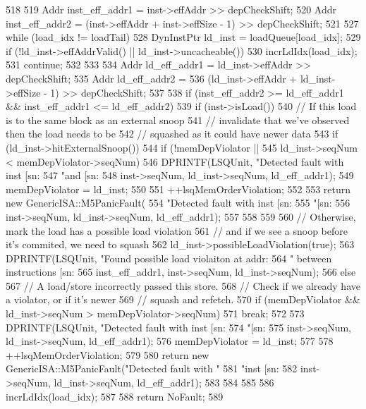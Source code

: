 \begin{DoxyCode}
518 {
519     Addr inst_eff_addr1 = inst->effAddr >> depCheckShift;
520     Addr inst_eff_addr2 = (inst->effAddr + inst->effSize - 1) >> depCheckShift;
521 
527     while (load_idx != loadTail) {
528         DynInstPtr ld_inst = loadQueue[load_idx];
529         if (!ld_inst->effAddrValid() || ld_inst->uncacheable()) {
530             incrLdIdx(load_idx);
531             continue;
532         }
533 
534         Addr ld_eff_addr1 = ld_inst->effAddr >> depCheckShift;
535         Addr ld_eff_addr2 =
536             (ld_inst->effAddr + ld_inst->effSize - 1) >> depCheckShift;
537 
538         if (inst_eff_addr2 >= ld_eff_addr1 && inst_eff_addr1 <= ld_eff_addr2) {
539             if (inst->isLoad()) {
540                 // If this load is to the same block as an external snoop
541                 // invalidate that we've observed then the load needs to be
542                 // squashed as it could have newer data
543                 if (ld_inst->hitExternalSnoop()) {
544                     if (!memDepViolator ||
545                             ld_inst->seqNum < memDepViolator->seqNum) {
546                         DPRINTF(LSQUnit, "Detected fault with inst [sn:%
547                                 "and [sn:%
548                                 inst->seqNum, ld_inst->seqNum, ld_eff_addr1);
549                         memDepViolator = ld_inst;
550 
551                         ++lsqMemOrderViolation;
552 
553                         return new GenericISA::M5PanicFault(
554                                 "Detected fault with inst [sn:%
555                                 "[sn:%
556                                 inst->seqNum, ld_inst->seqNum, ld_eff_addr1);
557                     }
558                 }
559 
560                 // Otherwise, mark the load has a possible load violation
561                 // and if we see a snoop before it's commited, we need to squash
562                 ld_inst->possibleLoadViolation(true);
563                 DPRINTF(LSQUnit, "Found possible load violaiton at addr: %
564                         " between instructions [sn:%
565                         inst_eff_addr1, inst->seqNum, ld_inst->seqNum);
566             } else {
567                 // A load/store incorrectly passed this store.
568                 // Check if we already have a violator, or if it's newer
569                 // squash and refetch.
570                 if (memDepViolator && ld_inst->seqNum > memDepViolator->seqNum)
571                     break;
572 
573                 DPRINTF(LSQUnit, "Detected fault with inst [sn:%
574                         "[sn:%
575                         inst->seqNum, ld_inst->seqNum, ld_eff_addr1);
576                 memDepViolator = ld_inst;
577 
578                 ++lsqMemOrderViolation;
579 
580                 return new GenericISA::M5PanicFault("Detected fault with "
581                         "inst [sn:%
582                         inst->seqNum, ld_inst->seqNum, ld_eff_addr1);
583             }
584         }
585 
586         incrLdIdx(load_idx);
587     }
588     return NoFault;
589 }
\end{DoxyCode}
